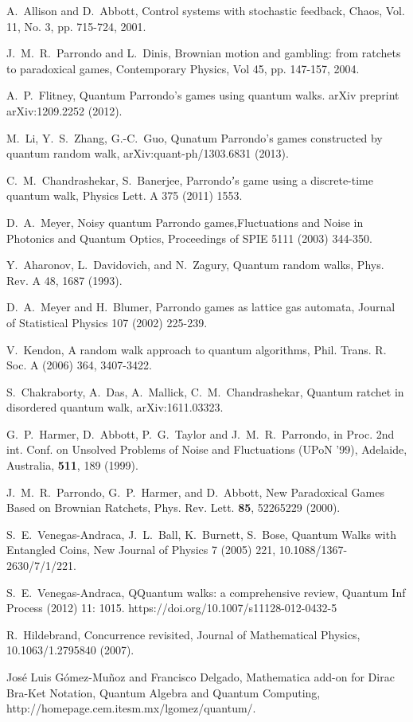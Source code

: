 \documentclass[english,aps,pra,amsmath,amssymb,showpacs,notitlepage,onecolumn]{revtex4-1}
\begin{document}
\begin{thebibliography}{99}
A.~Allison and D.~Abbott, Control systems with stochastic feedback, Chaos, Vol. 11, No. 3, pp. 715-724, 2001.

J.~M.~R.~Parrondo and L.~Dinis, Brownian motion and gambling: from ratchets to paradoxical games, Contemporary Physics, Vol 45, pp. 147-157, 2004.

A.~P.~Flitney, Quantum Parrondo's games using quantum walks. arXiv preprint arXiv:1209.2252 (2012).

M.~Li, Y.~S.~Zhang, G.-C.~Guo, Qunatum Parrondo's games constructed by quantum random walk, arXiv:quant-ph/1303.6831 (2013).

C.~M.~Chandrashekar, S.~Banerjee, Parrondoʼs game using a discrete-time quantum walk, Physics Lett. A 375 (2011) 1553.

D.~A.~Meyer, Noisy quantum Parrondo games,Fluctuations and Noise in Photonics and Quantum Optics, Proceedings of SPIE 5111 (2003) 344-350.

Y.~Aharonov, L.~Davidovich, and N.~Zagury, Quantum random walks, Phys. Rev. A 48, 1687 (1993).

D.~A.~Meyer and H.~Blumer, Parrondo games as lattice gas automata, Journal of Statistical Physics 107 (2002) 225-239.

V.~Kendon, A random walk approach to quantum algorithms, Phil. Trans. R. Soc. A (2006) 364, 3407-3422. 

S.~Chakraborty, A.~Das, A.~Mallick, C.~M.~Chandrashekar, Quantum ratchet in disordered quantum walk, arXiv:1611.03323.

 G.~P.~Harmer, D.~Abbott, P.~G.~Taylor and J.~M.~R.~Parrondo, in Proc. 2nd int. Conf. on Unsolved Problems of Noise and Fluctuations (UPoN '99), Adelaide, Australia, \textbf{511}, 189 (1999). %

 J.~M.~R.~Parrondo, G.~P.~Harmer, and D.~Abbott, New Paradoxical Games Based on Brownian Ratchets, Phys. Rev. Lett. \textbf{85}, 5226\textendash{}5229 (2000). %

S.~E.~Venegas-Andraca, J.~L.~Ball, K.~Burnett, S.~Bose, Quantum Walks with Entangled Coins, New Journal of Physics 7 (2005) 221, 10.1088/1367-2630/7/1/221.

S.~E.~Venegas-Andraca, QQuantum walks: a comprehensive review, Quantum Inf Process (2012) 11: 1015. https://doi.org/10.1007/s11128-012-0432-5

R.~Hildebrand, Concurrence revisited, Journal of Mathematical Physics, 10.1063/1.2795840 (2007).

Jos\'{e} Luis G\'{o}mez-Mu\~{n}oz and Francisco Delgado, Mathematica add-on for Dirac Bra-Ket Notation, Quantum Algebra and Quantum Computing, http://homepage.cem.itesm.mx/lgomez/quantum/.


\end{thebibliography}
 
\end{document}
